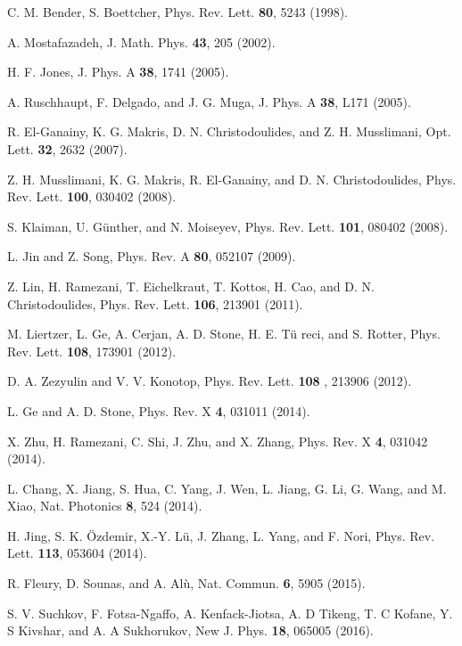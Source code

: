 \documentclass[prl,showpacs,superscriptaddress,twocolumn]{revtex4-1}
\begin{document}
\begin{thebibliography}{999}
 C. M. Bender, S. Boettcher, Phys. Rev. Lett. \textbf{80},
5243 (1998).

 A. Mostafazadeh, J. Math. Phys. \textbf{43}, 205 (2002).

 H. F. Jones, J. Phys. A \textbf{38}, 1741 (2005).

 A. Ruschhaupt, F. Delgado, and J. G. Muga, J. Phys. A
\textbf{38}, L171 (2005).

 R. El-Ganainy, K. G. Makris, D. N. Christodoulides, and Z. H.
Musslimani, Opt. Lett. \textbf{32}, 2632 (2007).

 Z. H. Musslimani, K. G. Makris, R. El-Ganainy, and D.
N. Christodoulides, Phys. Rev. Lett. \textbf{100}, 030402 (2008).

 S. Klaiman, U. G\"{u}nther, and N. Moiseyev, Phys. Rev.
Lett. \textbf{101}, 080402 (2008).

 L. Jin and Z. Song, Phys. Rev. A \textbf{80}, 052107 (2009).

 Z. Lin, H. Ramezani, T. Eichelkraut, T. Kottos, H. Cao, and
D. N. Christodoulides, Phys. Rev. Lett. \textbf{106}, 213901 (2011).

 M. Liertzer, L. Ge, A. Cerjan, A. D. Stone, H. E. T\"{u}%
reci, and S. Rotter, Phys. Rev. Lett. \textbf{108}, 173901 (2012).

 D. A. Zezyulin and V. V. Konotop, Phys. Rev. Lett. \textbf{108}%
, 213906 (2012).

 L. Ge and A. D. Stone, Phys. Rev. X \textbf{4}, 031011
(2014).

 X. Zhu, H. Ramezani, C. Shi, J. Zhu, and X. Zhang, Phys.
Rev. X \textbf{4}, 031042 (2014).

 L. Chang, X. Jiang, S. Hua, C. Yang, J. Wen, L. Jiang, G.
Li, G. Wang, and M. Xiao, Nat. Photonics \textbf{8}, 524 (2014).

 H. Jing, S. K. \"{O}zdemir, X.-Y. L\"{u}, J. Zhang, L. Yang,
and F. Nori, Phys. Rev. Lett. \textbf{113}, 053604 (2014).

 R. Fleury, D. Sounas, and A. Al\`{u}, Nat. Commun. \textbf{6},
5905 (2015).

 S. V. Suchkov, F. Fotsa-Ngaffo, A. Kenfack-Jiotsa, A. D
Tikeng, T. C Kofane, Y. S Kivshar, and A. A Sukhorukov, New J. Phys. \textbf{%
18}, 065005 (2016).


\end{thebibliography}
\end{document}
